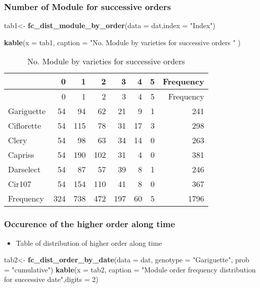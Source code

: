 \documentclass[]{article}
\newenvironment{Shaded}{\begin{snugshade}}{\end{snugshade}}
\newcommand{\KeywordTok}[1]{\textcolor[rgb]{0.13,0.29,0.53}{\textbf{#1}}}
\newcommand{\DataTypeTok}[1]{\textcolor[rgb]{0.13,0.29,0.53}{#1}}
\newcommand{\DecValTok}[1]{\textcolor[rgb]{0.00,0.00,0.81}{#1}}
\newcommand{\StringTok}[1]{\textcolor[rgb]{0.31,0.60,0.02}{#1}}
\newcommand{\NormalTok}[1]{#1}
\providecommand{\tightlist}{%
  \setlength{\itemsep}{0pt}\setlength{\parskip}{0pt}}
\begin{document}
\subsubsection{Number of Module for successive
orders}\label{number-of-module-for-successive-orders}

\begin{Shaded}
\begin{Highlighting}[]
\NormalTok{tab1<-}\StringTok{ }\KeywordTok{fc_dist_module_by_order}\NormalTok{(}\DataTypeTok{data =}\NormalTok{ dat,}\DataTypeTok{index =} \StringTok{"Index"}\NormalTok{)}

\KeywordTok{kable}\NormalTok{(}\DataTypeTok{x =}\NormalTok{ tab1,}
      \DataTypeTok{caption =} \StringTok{"No. Module by varieties for successive orders "}
\NormalTok{      )}
\end{Highlighting}
\end{Shaded}

\begin{longtable}[]{@{}lrrrrrrr@{}}
\caption{No. Module by varieties for successive orders}\tabularnewline
\toprule
& 0 & 1 & 2 & 3 & 4 & 5 & Frequency\tabularnewline
\midrule
\endfirsthead
\toprule
& 0 & 1 & 2 & 3 & 4 & 5 & Frequency\tabularnewline
\midrule
\endhead
Gariguette & 54 & 94 & 62 & 21 & 9 & 1 & 241\tabularnewline
Ciflorette & 54 & 115 & 78 & 31 & 17 & 3 & 298\tabularnewline
Clery & 54 & 98 & 63 & 34 & 14 & 0 & 263\tabularnewline
Capriss & 54 & 190 & 102 & 31 & 4 & 0 & 381\tabularnewline
Darselect & 54 & 87 & 57 & 39 & 8 & 1 & 246\tabularnewline
Cir107 & 54 & 154 & 110 & 41 & 8 & 0 & 367\tabularnewline
Frequency & 324 & 738 & 472 & 197 & 60 & 5 & 1796\tabularnewline
\bottomrule
\end{longtable}

\subsubsection{Occurence of the higher order along
time}\label{occurence-of-the-higher-order-along-time}

\begin{itemize}
\tightlist
\item
  Table of distribution of higher order along time
\end{itemize}

\begin{Shaded}
\begin{Highlighting}[]
\NormalTok{tab2<-}\StringTok{ }\KeywordTok{fc_dist_order_by_date}\NormalTok{(}\DataTypeTok{data =}\NormalTok{ dat,}
                             \DataTypeTok{genotype =} \StringTok{"Gariguette"}\NormalTok{,}
                             \DataTypeTok{prob =} \StringTok{"cumulative"}\NormalTok{)}
\KeywordTok{kable}\NormalTok{(}\DataTypeTok{x =}\NormalTok{ tab2, }
      \DataTypeTok{caption =} \StringTok{"Module order frequency distribution for successive date"}\NormalTok{,}\DataTypeTok{digits =} \DecValTok{2}\NormalTok{)}
\end{Highlighting}
\end{Shaded}
\end{document}
